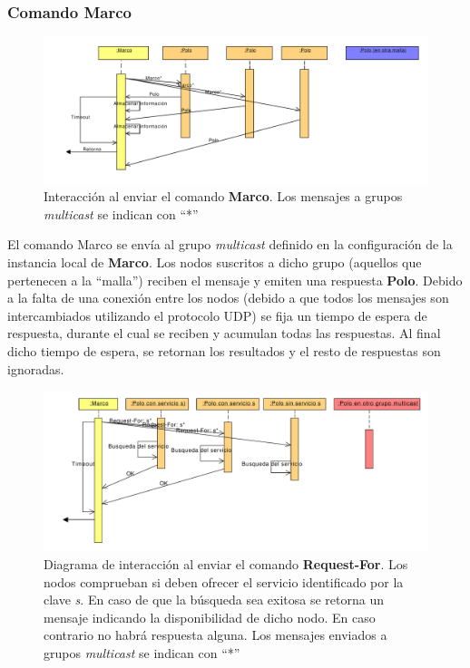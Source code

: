 \subsubsection{Comando \textbf{Marco}}

\begin{figure}[H]
\centering
\includegraphics[width=\textwidth]{Diagrams/Sequence/marcocompleto}
\caption{Interacción al enviar el comando \textbf{Marco}. Los mensajes a grupos \textit{multicast} se indican con ``*''}
\label{fig:secuencia_marco}
\end{figure}

El comando Marco se envía al grupo \textit{multicast} definido en la configuración de la instancia local de \textbf{Marco}. Los nodos suscritos a dicho grupo (aquellos que pertenecen a la ``malla'') reciben el mensaje y emiten una respuesta \textbf{Polo}. Debido a la falta de una conexión entre los nodos (debido a que todos los mensajes son intercambiados utilizando el protocolo UDP) se fija un tiempo de espera de respuesta, durante el cual se reciben y acumulan todas las respuestas. Al final dicho tiempo de espera, se retornan los resultados y el resto de respuestas son ignoradas.

\begin{figure}[H]
\centering
\includegraphics[width=\textwidth]{Diagrams/Sequence/request_for}
\caption{Diagrama de interacción al enviar el comando \textbf{Request-For}. Los nodos comprueban si deben ofrecer el servicio identificado por la clave \textit{s}. En caso de que la búsqueda sea exitosa se retorna un mensaje indicando la disponibilidad de dicho nodo. En caso contrario no habrá respuesta alguna.
Los mensajes enviados a grupos \textit{multicast} se indican con ``*''}
\label{fig:secuencia_request_for}
\end{figure}

